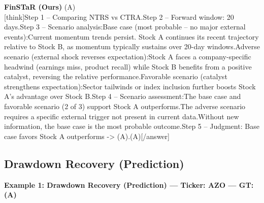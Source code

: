 \begin{minipage}[t]{0.41\textwidth}
\colorbox{green!10}{\parbox{\dimexpr\textwidth-2\fboxsep}{
\textbf{FinSTaR (Ours)} \textcolor{green!50!black}{(A)} \\[2pt]
\tiny
[think]\newline Step 1 -- Comparing NTRS vs CTRA.\newline Step 2 -- Forward window: 20 days.\newline Step 3 -- Scenario analysis:\newline   Base case (most probable -- no major external events):\newline     Current momentum trends persist. Stock A continues its recent trajectory relative to Stock B, as momentum typically sustains over 20-day windows.\newline   Adverse scenario (external shock reverses expectation):\newline     Stock A faces a company-specific headwind (earnings miss, product recall) while Stock B benefits from a positive catalyst, reversing the relative performance.\newline   Favorable scenario (catalyst strengthens expectation):\newline     Sector tailwinds or index inclusion further boosts Stock A's advantage over Stock B.\newline Step 4 -- Scenario assessment:\newline   The base case and favorable scenario (2 of 3) support Stock A outperforms.\newline   The adverse scenario requires a specific external trigger not present in current data.\newline   Without new information, the base case is the most probable outcome.\newline Step 5 -- Judgment: Base case favors Stock A outperforms -> (A).\newline [/think]\newline [answer](A)[/answer]
}}
\vspace{-40pt}
\end{minipage}

\clearpage
\subsection{Drawdown Recovery (Prediction)}


\noindent
\textbf{Example 1: Drawdown Recovery (Prediction) --- Ticker: AZO --- GT: (A)}
\vspace{2pt}

